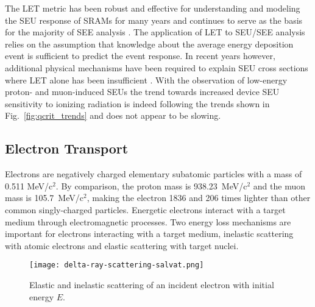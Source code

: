 The LET metric has been robust and effective for understanding and modeling the SEU response of SRAMs for many years and continues to serve as the basis for the majority of SEE analysis \cite{Dodd:1998tn,Dodd:1998ua,Dodd:2001tx}.
The application of LET to SEU/SEE analysis relies on the assumption that knowledge about the average energy deposition event is sufficient to predict the event response. 
In recent years however, additional physical mechanisms have been required to explain SEU cross sections where LET alone has been insufficient \cite{Reed:2002wn,Kobayashi:2005jt,Reed:2006cx,Reed:2007vz,Warren:2007ca}. 
With the observation of low-energy proton- and muon-induced SEUs the trend towards increased device SEU sensitivity to ionizing radiation is indeed following the trends shown in Fig.~\ref{fig:qcrit_trends} and does not appear to be slowing.

\subsection{Electron Transport} %
\label{sub:electron_transport}
Electrons are negatively charged elementary subatomic particles with a mass of 0.511 MeV/c$^2$.
By comparison, the proton mass is 938.23~MeV/c$^2$ and the muon mass is 105.7~MeV/c$^2$, making the electron 1836 and 206 times lighter than other common singly-charged particles.
Energetic electrons interact with a target medium through electromagnetic processes. 
Two energy loss mechanisms are important for electrons interacting with a target medium, inelastic scattering with atomic electrons and elastic scattering with target nuclei.
\begin{figure}[htbp]
    \begin{center}
        \texttt{[image: delta-ray-scattering-salvat.png]}
    \end{center}
    \caption{Elastic and inelastic scattering of an incident electron with initial energy $E$.}
    \label{fig:electron-scattering-elastic-inelastic}
\end{figure}

